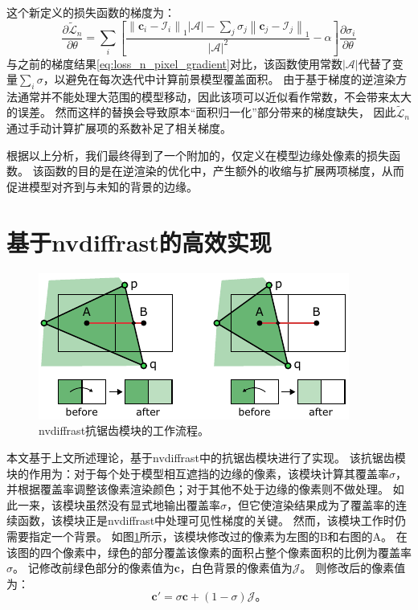 这个新定义的损失函数的梯度为：
\begin{equation}
\frac{\partial\tilde{\mathcal{L}}_n}{\partial\theta} =
\sum_{i}\left[
    \frac{
        \textstyle \left\| \mathbf{c}_i - \mathcal{I}_i \right\|_1 |\mathcal{A}| -
        \textstyle \sum_j \sigma_j \left\| \mathbf{c}_j - \mathcal{I}_j \right\|_1
    }{|\mathcal{A}|^2} - \alpha
\right]\frac{\partial\sigma_i}{\partial\theta}
\end{equation}
与之前的梯度结果\eqref{eq:loss_n_pixel_gradient}对比，该函数使用常数$|\mathcal{A}|$代替了变量$\sum_{i} \sigma$，以避免在每次迭代中计算前景模型覆盖面积。
由于基于梯度的逆渲染方法通常并不能处理大范围的模型移动，因此该项可以近似看作常数，不会带来太大的误差。
然而这样的替换会导致原本“面积归一化”部分带来的梯度缺失，
因此$\tilde{\mathcal{L}}_n$通过手动计算扩展项的系数补足了相关梯度。

根据以上分析，我们最终得到了一个附加的，仅定义在模型边缘处像素的损失函数。
该函数的目的是在逆渲染的优化中，产生额外的收缩与扩展两项梯度，从而促进模型对齐到与未知的背景的边缘。

\section{基于nvdiffrast的高效实现}

\begin{figure}[ht]
    \centering
    \includegraphics{figures/antialias}
    \caption[nvdiffrast抗锯齿模块的工作流程]{nvdiffrast抗锯齿模块的工作流程\citep{nvdiffrast}。}
    \label{fig:aa}
\end{figure}
本文基于上文所述理论，基于nvdiffrast\citep{nvdiffrast}中的抗锯齿模块进行了实现。
该抗锯齿模块的作用为：对于每个处于模型相互遮挡的边缘的像素，该模块计算其覆盖率$\sigma$，并根据覆盖率调整该像素渲染颜色；对于其他不处于边缘的像素则不做处理。
如此一来，该模块虽然没有显式地输出覆盖率$\sigma$，但它使渲染结果成为了覆盖率的连续函数，该模块正是nvdiffrast中处理可见性梯度的关键。
然而，该模块工作时仍需要指定一个背景。
如图\ref{fig:aa}所示，该模块修改过的像素为左图的B和右图的A。
在该图的四个像素中，绿色的部分覆盖该像素的面积占整个像素面积的比例为覆盖率$\sigma$。
记修改前绿色部分的像素值为$\mathbf{c}$，白色背景的像素值为$\mathcal{J}$。
则修改后的像素值为：
\begin{equation}
\mathbf{c}' = \sigma\mathbf{c} + (1-\sigma)\mathcal{J}
\text{。}
\end{equation}

